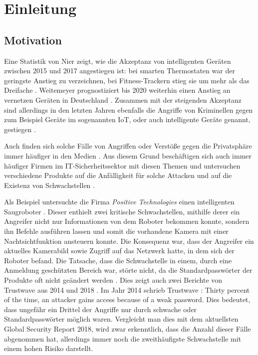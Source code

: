 \chapter{Einleitung}

\section{Motivation}
Eine Statistik von Nier zeigt, wie die Akzeptanz von intelligenten Geräten zwischen 2015 und 2017 angestiegen ist: bei smarten Thermostaten war der geringste Anstieg zu verzeichnen, bei Fitness-Trackern stieg sie um mehr als das Dreifache \cite{nier_2017}. Weitemeyer prognostiziert bis 2020 weiterhin einen Anstieg an vernetzen Geräten in Deutschland \cite{weitemeyer_2018}.
Zusammen mit der steigenden Akzeptanz sind allerdings in den letzten Jahren ebenfalls die Angriffe von Kriminellen gegen zum Beispiel Geräte im sogenannten \ac{IoT}, oder auch intelligente Geräte genannt, gestiegen \cite{statista_2019}.

Auch finden sich solche Fälle von Angriffen oder Verstöße gegen die Privatsphäre immer häufiger in den Medien \cite{holland_2016,it_verlag_informationstechnik_gmbh_2018}. Aus diesem Grund beschäftigen sich auch immer häufiger Firmen im IT-Sicherheitssektor mit diesen Themen und untersuchen verschiedene Produkte auf die Anfälligkeit für solche Attacken und auf die Existenz von Schwachstellen \cite{lorenz_2018,ao_kaspersky_lab_2018}.

Als Beispiel untersuchte die Firma \emph{Positive Technologies} einen intelligenten Saugroboter \cite{salmi_2017}.
Dieser enthielt zwei kritische Schwachstellen, mithilfe derer ein Angreifer nicht nur Informationen von dem Roboter bekommen konnte, sondern ihn Befehle ausführen lassen und somit die vorhandene Kamera mit einer Nachtsichtfunktion ansteuern konnte. Die Konsequenz war, dass der Angreifer ein aktuelles Kamerabild sowie Zugriff auf das Netzwerk hatte, in dem sich der Roboter befand. Die Tatsache, dass die Schwachstelle in einem, durch eine Anmeldung geschützten Bereich war, störte nicht, da die Standardpasswörter der Produkte oft nicht geändert werden \cite{positive_technologies_2018}.
Dies zeigt auch zwei Berichte von Trustwave aus 2014 und 2018 \cite{trustwave_holdings_inc_2014,trustwave_holdings_inc_2018}.
Im Jahr 2014 schrieb Trustwave \cite{trustwave_holdings_inc_2014}: \glqq Thirty percent of the time, an attacker gains access because of a weak password.\grqq{}
Dies bedeutet, dass ungefähr ein Drittel der Angriffe nur durch schwache oder Standardpasswörter möglich waren. Vergleicht man dies mit dem aktuellsten Global Security Report 2018, wird zwar erkenntlich, dass die Anzahl dieser Fälle abgenommen hat, allerdings immer noch die zweithäufigste Schwachstelle mit einem hohen Risiko darstellt.

